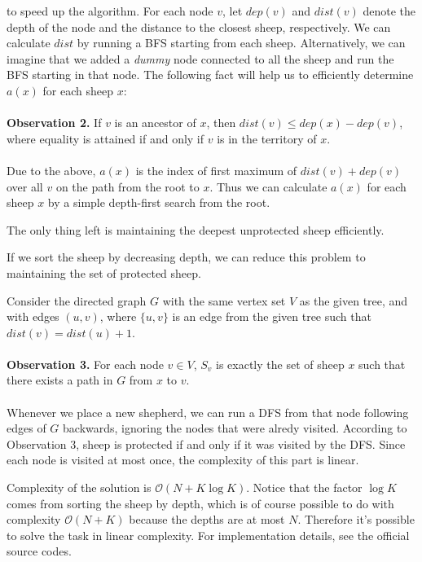to speed up the algorithm. For each node $v$, let $dep(v)$ and $dist(v)$
denote the depth of the node and the distance to the closest sheep, 
respectively. We can calculate $dist$ by running a BFS starting from each sheep.
Alternatively, we can
imagine that we added a \textit{dummy} node connected to all the sheep and run
the BFS starting in that node. The following fact will help us to
efficiently determine $a(x)$ for each sheep $x$: \\\\
\textbf{Observation 2.} If $v$ is an ancestor of $x$, then $dist(v) \leq
dep(x) - dep(v)$, where equality is attained if and only if $v$ is in the
territory of $x$.
\\\\
Due to the above, $a(x)$ is the index of first maximum of  
$dist(v) + dep(v)$ over all $v$ on the path from the root to $x$. 
Thus we can calculate $a(x)$ for each sheep $x$ 
by a simple depth-first search from the root.

The only thing left is maintaining the deepest unprotected sheep efficiently.

If we sort the sheep by decreasing depth, 
we can reduce this problem to maintaining the set of protected sheep.

Consider the directed graph $G$ with the same vertex set $V$ as the given tree, and with edges
$(u, v)$, where $\{u, v\}$ is an edge from the given tree such that $dist(v) =
dist(u) + 1$.
\\\\
\textbf{Observation 3.} For each node $v \in V$, $S_v$ is exactly the set of
sheep $x$ such that there exists a path in $G$ from $x$ to $v$.
\\\\
Whenever we place a new shepherd, we can run a DFS from that node following
edges of $G$ backwards, ignoring the nodes that were alredy visited. According
to Observation 3, sheep is protected if and only if it was visited by the DFS.
Since each node is visited at most once, the complexity of this part is linear.

Complexity of the solution is $\mathcal{O}(N + K\log K)$. Notice that the factor
$\log  K$ comes from sorting the sheep by depth, which is of course possible to
do with complexity $\mathcal{O}(N + K)$ because the depths are at most $N$.
Therefore it's possible to solve the task in linear complexity. For
implementation details, see the official source codes.
